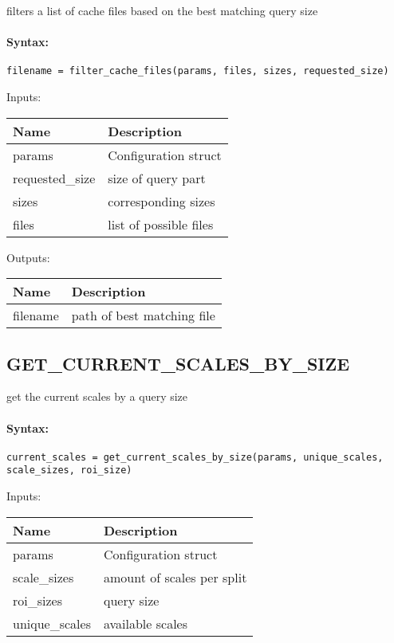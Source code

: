 filters a list of cache files based on the best matching query size

\paragraph{Syntax:} \verb|filename = filter_cache_files(params, files, sizes, requested_size)|

\bigskip
Inputs:

\begin{tabular}{|p{}|p{}|}
\hline
\textbf{Name} & \textbf{Description} \\
\hline \hline
params & Configuration struct  \\ \hline
requested\_size & size of query part  \\ \hline
sizes & corresponding sizes  \\ \hline
files & list of possible files  \\ \hline
\end{tabular}

\bigskip
Outputs:

\begin{tabular}{|p{}|p{}|}
\hline
\textbf{Name} & \textbf{Description} \\
\hline \hline
filename & path of best matching file  \\ \hline
\end{tabular}

\subsection{GET\_CURRENT\_SCALES\_BY\_SIZE}

get the current scales by a query size

\paragraph{Syntax:} \verb|current_scales = get_current_scales_by_size(params, unique_scales, scale_sizes, roi_size)|

\bigskip
Inputs:

\begin{tabular}{|p{}|p{}|}
\hline
\textbf{Name} & \textbf{Description} \\
\hline \hline
params & Configuration struct  \\ \hline
scale\_sizes & amount of scales per split  \\ \hline
roi\_sizes & query size  \\ \hline
unique\_scales & available scales  \\ \hline
\end{tabular}

